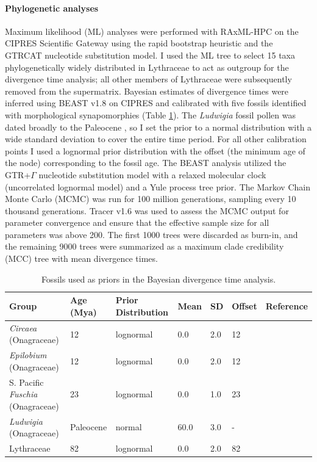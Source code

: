 \documentclass[review]{elsarticle}
\begin{document}
\paragraph{Phylogenetic analyses} 
Maximum likelihood (ML) analyses were performed with RAxML-HPC \citep{raxml} on the CIPRES Scientific Gateway \citep{cipres} 
using the rapid bootstrap heuristic and the GTRCAT nucleotide substitution model.
I used the ML tree to select 15 taxa phylogenetically widely distributed in Lythraceae to act as outgroup for the divergence time analysis; 
all other members of Lythraceae were subsequently removed from the supermatrix.
Bayesian estimates of divergence times were inferred using BEAST v1.8 \citep{beast, beast2} on CIPRES and calibrated with five fossils 
identified with morphological synapomorphies (Table \ref{fossils}).
The \textit{Ludwigia} fossil pollen was dated broadly to the Paleocene \citep{grimsson}, so I set the prior to a normal distribution with a wide 
standard deviation to cover the entire time period.
For all other calibration points I used a lognormal prior distribution with the offset (the minimum age of the node) corresponding to the fossil age.
The BEAST analysis utilized the GTR+$\Gamma$ nucleotide substitution model with a relaxed molecular clock (uncorrelated lognormal model)
and a Yule process tree prior.
The Markov Chain Monte Carlo (MCMC) was run for 100 million generations, sampling every 10 thousand generations.
Tracer v1.6 \citep{tracer} was used to assess the MCMC output for parameter convergence and ensure that the effective sample size for all parameters was above 200.
The first 1000 trees were discarded as burn-in, and the remaining 9000 trees were summarized as a maximum clade credibility (MCC) tree with mean divergence times. 

\begin{table}
   \center
   \begin{adjustbox}{max width=\textwidth}
      \begin{tabular}{lllllll}
         \toprule
         Group & Age (Mya) & Prior Distribution & Mean & SD & Offset & Reference \\ 
	 \midrule
         \textit{Circaea} (Onagraceae) & 12 & lognormal & 0.0 & 2.0 & 12 & \citep{grimsson} \\
         \textit{Epilobium} (Onagraceae) & 12 & lognormal & 0.0 & 2.0 & 12 & \citep{grimsson} \\
         S. Pacific \textit{Fuschia} (Onagraceae) & 23 & lognormal & 0.0 & 1.0 & 23 & \citep{lee2013fossil} \\
         \textit{Ludwigia} (Onagraceae) & Paleocene & normal & 60.0 & 3.0 & - & \citep{zhi} \\
         Lythraceae & 82 & lognormal & 0.0 & 2.0 & 82 & \citep{graham} \\
         \bottomrule
      \end{tabular}
   \end{adjustbox}
   \caption{Fossils used as priors in the Bayesian divergence time analysis.}
   \label{fossils}
\end{table}
\end{document}
